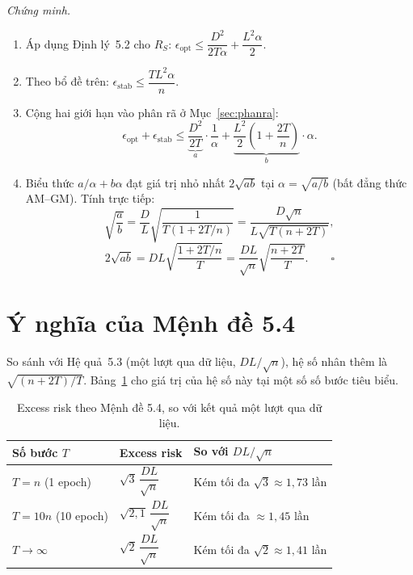 \textit{Chứng minh.}
\begin{enumerate}
    \item Áp dụng Định lý~5.2 cho $R_S$: $\epsilon_{\mathrm{opt}} \le \dfrac{D^2}{2T\alpha} + \dfrac{L^2\alpha}{2}$.
    \item Theo bổ đề trên: $\epsilon_{\mathrm{stab}} \le \dfrac{T L^2 \alpha}{n}$.
    \item Cộng hai giới hạn vào phân rã ở Mục~\ref{sec:phanra}:
    \[
    \epsilon_{\mathrm{opt}} + \epsilon_{\mathrm{stab}} \le \underbrace{\frac{D^2}{2T}}_{a}\cdot\frac{1}{\alpha} + \underbrace{\frac{L^2}{2}\left(1 + \frac{2T}{n}\right)}_{b}\cdot\alpha.
    \]
    \item Biểu thức $a/\alpha + b\alpha$ đạt giá trị nhỏ nhất $2\sqrt{ab}$ tại $\alpha = \sqrt{a/b}$ (bất đẳng thức AM--GM). Tính trực tiếp:
    \[
    \sqrt{\frac{a}{b}} = \frac{D}{L}\sqrt{\frac{1}{T(1 + 2T/n)}} = \frac{D\sqrt{n}}{L\sqrt{T(n+2T)}},
    \]
    \[
    2\sqrt{ab} = DL\sqrt{\frac{1 + 2T/n}{T}} = \frac{DL}{\sqrt{n}}\sqrt{\frac{n + 2T}{T}}. \qquad \square
    \]
\end{enumerate}

\section{Ý nghĩa của Mệnh đề 5.4}
\label{sec:ynghia54}

So sánh với Hệ quả~5.3 (một lượt qua dữ liệu, $DL/\sqrt{n}$), hệ số nhân thêm là $\sqrt{(n+2T)/T}$. Bảng~\ref{tab:menhde54} cho giá trị của hệ số này tại một số số bước tiêu biểu.

\begin{table}[H]
\centering
\caption{Excess risk theo Mệnh đề 5.4, so với kết quả một lượt qua dữ liệu.}
\label{tab:menhde54}
\begin{tabular}{|p{3.5cm}|p{3.8cm}|p{5.6cm}|}
\hline
\textbf{Số bước $T$} & \textbf{Excess risk} & \textbf{So với $DL/\sqrt{n}$} \\ \hline
$T = n$ (1 epoch) & $\sqrt{3}\,\dfrac{DL}{\sqrt{n}}$ & Kém tối đa $\sqrt{3} \approx 1{,}73$ lần \\ \hline
$T = 10n$ (10 epoch) & $\sqrt{2{,}1}\,\dfrac{DL}{\sqrt{n}}$ & Kém tối đa $\approx 1{,}45$ lần \\ \hline
$T \to \infty$ & $\sqrt{2}\,\dfrac{DL}{\sqrt{n}}$ & Kém tối đa $\sqrt{2} \approx 1{,}41$ lần \\ \hline
\end{tabular}
\end{table}

